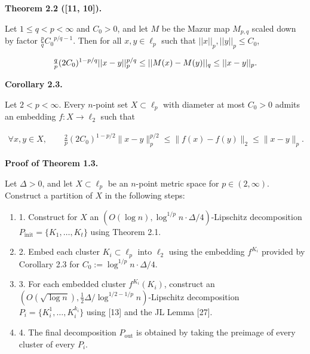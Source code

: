 \documentclass[10pt,a4paper]{amsart}
\begin{document}
\par
\par
\par\medskip\noindent\textbf{Theorem 2.2 ([11, 10]).}\par
Let $1\leq{q}<p<\infty$ and $C_{0}>0$, and let $M$ be the Mazur map $M_{p,q}$ scaled down by factor $\frac{p}{q}{C_{0}}^{p/q-1}$. Then for all $x,y\in\ell_{p}$ such that $||x||_{p},||y||_{p}\leq C_{0}$,
\par
\[\begin{aligned}
\tfrac{q}{p}(2C_{0})^{1-p/q}||x-y||_{p}^{p/q}\leq||M(x)-M(y)||_{q}\leq||x-y||_%
{p}.
\end{aligned}\]
\par
\par
\par\medskip\noindent\textbf{Corollary 2.3.}\par
Let $2<p<\infty$. Every $n$-point set $X\subset\ell_{p}$ with diameter at most $C_{0}>0$ admits an embedding $f:X\to\ell_{2}$ such that
\par
\[\begin{aligned}
\forall x,y\in X,\qquad\tfrac{2}{p}(2C_{0})^{1-p/2}\|x-y\|_{p}^{p/2}\leq\|f(x)%
-f(y)\|_{2}\leq\|x-y\|_{p}.
\end{aligned}\]
\par
\par
\par\medskip\noindent\textbf{Proof of Theorem 1.3.}\par
Let $\Delta>0$, and let $X\subset\ell_{p}$ be an $n$-point metric space for $p\in(2,\infty)$. Construct a partition of $X$ in the following steps:
\par
\begin{enumerate}
\item  1. 
Construct for $X$ an $(O(\log{n}),\log^{1/p}{n}\cdot\Delta/4)$-Lipschitz decomposition $P_{\text{init}}=\{K_{1},\ldots,K_{t}\}$ using Theorem 2.1.
\par
\par
\item  2. 
Embed each cluster $K_{i}\subset\ell_{p}$ into $\ell_{2}$ using the embedding $f^{K_{i}}$ provided by Corollary 2.3 for $C_{0}:=\log^{1/p}{n}\cdot\Delta/4$.
\par
\par
\item  3. 
For each embedded cluster $f^{K_{i}}(K_{i})$, construct an $(O(\sqrt{\log{n}}),\frac{1}{2}\Delta/\log^{1/2-1/p}n)$-Lipschitz decomposition $P_{i}=\{K_{i}^{1},\ldots,K_{i}^{k_{i}}\}$ using [13] and the JL Lemma [27].
\par
\par
\item  4. 
The final decomposition $P_{\text{out}}$ is obtained by taking the preimage of every cluster of every $P_{i}$.
\par
\par
\end{enumerate}
\end{document}
